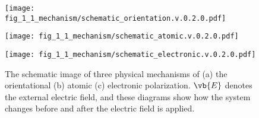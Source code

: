 \begin{figure}[htb]
 \centering
\begin{subcaptionblock}{0.3\linewidth}
 \subcaption{}\label{fig:mechanism:1}
  \texttt{[image: fig\_1\_1\_mechanism/schematic\_orientation.v.0.2.0.pdf]} 
\end{subcaptionblock}
\begin{subcaptionblock}{0.3\linewidth}
 \subcaption{}\label{fig:mechanism:2}
  \texttt{[image: fig\_1\_1\_mechanism/schematic\_atomic.v.0.2.0.pdf]} 
\end{subcaptionblock}
\begin{subcaptionblock}{0.3\linewidth}
 \subcaption{}\label{fig:mechanism:3}
  \texttt{[image: fig\_1\_1\_mechanism/schematic\_electronic.v.0.2.0.pdf]} 
\end{subcaptionblock}
  \caption{The schematic image of three physical mechanisms of (a) the orientational (b) atomic (c) electronic polarization. $\vb{E}$ denotes the external electric field, and these diagrams show how the system changes before and after the electric field is applied.}
\label{Fig:mechanism}
\end{figure}
